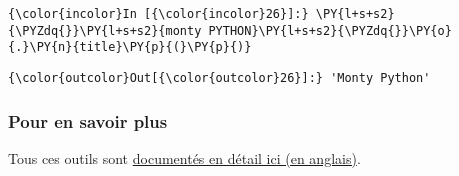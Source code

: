     \begin{Verbatim}[commandchars=\\\{\}]
{\color{incolor}In [{\color{incolor}26}]:} \PY{l+s+s2}{\PYZdq{}}\PY{l+s+s2}{monty PYTHON}\PY{l+s+s2}{\PYZdq{}}\PY{o}{.}\PY{n}{title}\PY{p}{(}\PY{p}{)}
\end{Verbatim}


\begin{Verbatim}[commandchars=\\\{\}]
{\color{outcolor}Out[{\color{outcolor}26}]:} 'Monty Python'
\end{Verbatim}
            
    \hypertarget{pour-en-savoir-plus}{%
\subsubsection{Pour en savoir plus}\label{pour-en-savoir-plus}}

    Tous ces outils sont
\href{https://docs.python.org/3/library/stdtypes.html\#string-methods}{documentés
en détail ici (en anglais)}.